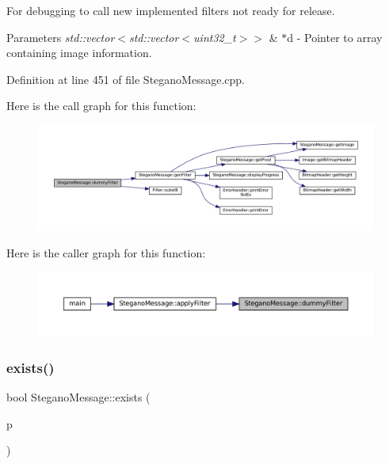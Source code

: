 For debugging to call new implemented filters not ready for release. 


\begin{DoxyParams}{Parameters}
{\em std\+::vector$<$std\+::vector$<$uint32\+\_\+t$>$$>$} & $\ast$d -\/ Pointer to array containing image information. \\
\hline
\end{DoxyParams}


Definition at line 451 of file Stegano\+Message.\+cpp.

Here is the call graph for this function\+:\nopagebreak
\begin{figure}[H]
\begin{center}
\leavevmode
\includegraphics[width=350pt]{classSteganoMessage_a1a26242c2e6d146cba1ad6831ab60ba7_cgraph}
\end{center}
\end{figure}
Here is the caller graph for this function\+:\nopagebreak
\begin{figure}[H]
\begin{center}
\leavevmode
\includegraphics[width=350pt]{classSteganoMessage_a1a26242c2e6d146cba1ad6831ab60ba7_icgraph}
\end{center}
\end{figure}
\mbox{\label{classSteganoMessage_acc5a49a35b46d8bf4c40cca8b8c5a52b}} 
\subsubsection{\texorpdfstring{exists()}{exists()}}
{\footnotesize\ttfamily bool Stegano\+Message\+::exists (\begin{DoxyParamCaption}\item[{std\+::string}]{p }\end{DoxyParamCaption})}



